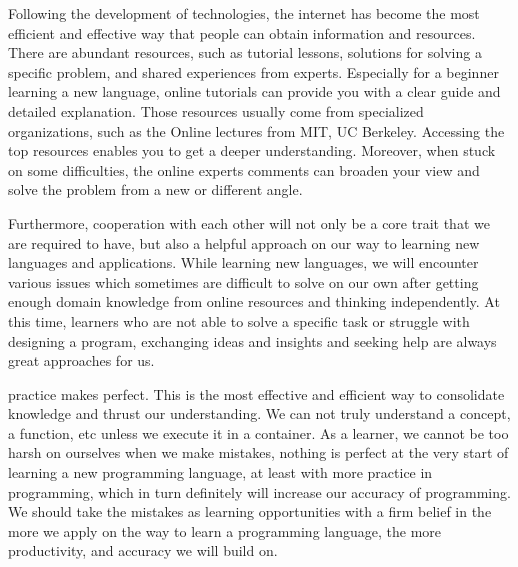 \documentclass[a4paper, 11pt]{report}
\begin{document}

\noindent Following the development of technologies, the internet has become the most efficient and effective way that people can obtain information and resources. There are abundant resources, such as tutorial lessons, solutions for solving a specific problem, and shared experiences from experts. Especially for a beginner learning a new language, online tutorials can provide you with a clear guide and detailed explanation. Those resources usually come from specialized organizations, such as the Online lectures from MIT, UC Berkeley. Accessing the top resources enables you to get a deeper understanding. Moreover, when stuck on some difficulties, the online experts comments can broaden your view and solve the problem from a new or different angle.\\


\noindent Furthermore, cooperation with each other will not only be a core trait that we are required to have, but also a helpful approach on our way to learning new languages and applications. While learning new languages, we will encounter various issues which sometimes are difficult to solve on our own after getting enough domain knowledge from online resources and thinking independently. At this time, learners who are not able to solve a specific task or struggle with designing a program, exchanging ideas and insights and seeking help are always great approaches for us. \\


\noindent practice makes perfect. This is the most effective and efficient way to consolidate knowledge and thrust our understanding.  We can not truly understand a concept,  a function, etc unless we execute it in a container. As a learner, we cannot be too harsh on ourselves when we make mistakes, nothing is perfect at the very start of learning a new programming language, at least with more practice in programming, which in turn definitely will increase our accuracy of programming. We should take the mistakes as learning opportunities with a firm belief in the more we apply on the way to learn a programming language, the more productivity, and accuracy we will build on. \\
\end{document}
